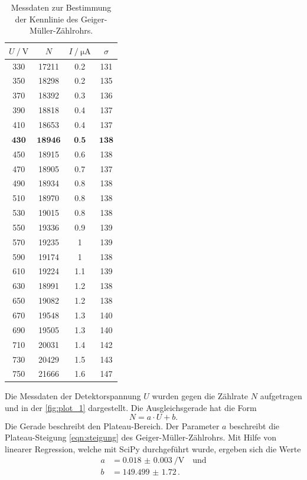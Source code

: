 \begin{table}[H]
    \centering
    \caption{Messdaten zur Bestimmung der Kennlinie des Geiger-Müller-Zählrohrs.}
    \label{tab:kennlinie}
\begin{tabular}{c c c c}
    \toprule
    $U \mathbin{/} \mathrm{V}$ & $N$ &  $I \mathbin{/} \unit{\micro\ampere}$ & $\sigma$\\
    \midrule
         330 &    17211 &   0.2 & 131\\
         350 &    18298 &   0.2 & 135\\
         370 &    18392 &   0.3 & 136\\
         390 &    18818 &   0.4 & 137\\
         410 &    18653 &   0.4 & 137\\
         $\textbf{430}$ &    $\textbf{18946}$ &   $\textbf{0.5}$ & $\textbf{138}$\\
         450 &    18915 &   0.6 & 138\\
         470 &    18905 &   0.7 & 137\\
         490 &    18934 &   0.8 & 138\\
         510 &    18970 &   0.8 & 138\\
         530 &    19015 &   0.8 & 138\\
         550 &    19336 &   0.9 & 139\\
         570 &    19235 &     1 & 139\\
         590 &    19174 &     1 & 138\\
         610 &    19224 &   1.1 & 139\\
         630 &    18991 &   1.2 & 138\\
         650 &    19082 &   1.2 & 138\\
         670 &    19548 &   1.3 & 140\\
         690 &    19505 &   1.3 & 140\\
         710 &    20031 &   1.4 & 142\\
         730 &    20429 &   1.5 & 143\\
         750 &    21666 &   1.6 & 147\\
    \bottomrule
    \end{tabular}
\end{table}


Die Messdaten der Detektorspannung $U$ wurden gegen die Zählrate $N$ aufgetragen und in der
\autoref{fig:plot_1} dargestellt. Die Ausgleichsgerade hat die Form
\begin{equation*}
    N = a \cdot U + b.
\end{equation*}
Die Gerade beschreibt den Plateau-Bereich. Der Parameter $a$ beschreibt die Plateau-Steigung \eqref{eqn:steigung} des Geiger-Müller-Zählrohrs.
Mit Hilfe von linearer Regression, welche mit SciPy \cite{scipy} durchgeführt wurde, ergeben sich die Werte
\begin{align*}
    a &= \qty{0.018(3)}{\per\volt} \quad \text{und} \\
    b &= \num{149.499(1720)} \, .
\end{align*}

